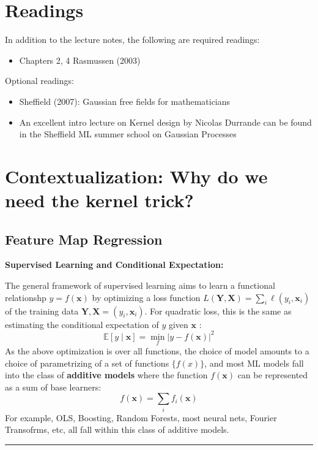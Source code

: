\documentclass[11pt]{article}
\theoremstyle{plain} %
\theoremstyle{remark}
\begin{document}
\begin{center}

  {}
\end{center}
\vspace{2em}

\tableofcontents

\section*{Readings}
In addition to the lecture notes, the following are required readings:

\begin{itemize}
  \item Chapters 2, 4 Rasmussen (2003)
\end{itemize}

Optional readings:

\begin{itemize}
  \item Sheffield (2007): Gaussian free fields for mathematicians

  \item An excellent intro lecture on Kernel design by Nicolas Durrande can be found in the Sheffield ML summer school on Gaussian Processes

\end{itemize}

\section{Contextualization: Why do we need the kernel trick?}

\subsection{Feature Map Regression}

\textbf{Supervised Learning and Conditional Expectation:}

The general framework of supervised learning aims to learn a functional
relationshp $y=f(\mathbf{x})$ by optimizing a loss function $L(\mathbf{Y},
  \mathbf{X})=\sum_{i} \ell\left(y_{i}, \mathbf{x}_{i}\right)$ of the training
data $\mathbf{Y},
  \mathbf{X}=\left(y_{i}, \mathbf{x}_{i}\right)$. For quadratic loss, this is the same as
estimating the conditional expectation of $y$ given $\mathbf{x}$ :
$$
  \mathbb{E}[y \mid \mathbf{x}]=\min _{f}|y-f(\mathbf{x})|^{2}
$$
As the above optimization is over all functions, the choice of model amounts to
a choice of parametrizing of a set of functions $\{f(x)\}$, and most ML models fall into the class of
\textbf{additive models} where the function
$f(\mathbf{x})$ can be represented as a sum of base learners:
$$
  f(\mathbf{x})=\sum_{i} f_{i}(\mathbf{x})
$$
For example, OLS, Boosting, Random Forests, most neural nets, Fourier
Transofrms, etc, all fall within this class of additive models.
\vspace*{0.6em}
\hrule
\end{document}
